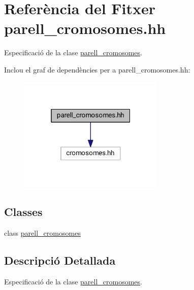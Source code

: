 \hypertarget{parell__cromosomes_8hh}{}\section{Referència del Fitxer parell\+\_\+cromosomes.\+hh}
\label{parell__cromosomes_8hh}


Especificació de la clase \hyperlink{classparell__cromosomes}{parell\+\_\+cromosomes}.  


Inclou el graf de dependències per a parell\+\_\+cromosomes.\+hh\+:\nopagebreak
\begin{figure}[H]
\begin{center}
\leavevmode
\includegraphics[width=196pt]{parell__cromosomes_8hh__incl}
\end{center}
\end{figure}
\subsection*{Classes}
\begin{DoxyCompactItemize}
\item 
class \hyperlink{classparell__cromosomes}{parell\+\_\+cromosomes}
\end{DoxyCompactItemize}


\subsection{Descripció Detallada}
Especificació de la clase \hyperlink{classparell__cromosomes}{parell\+\_\+cromosomes}. 

